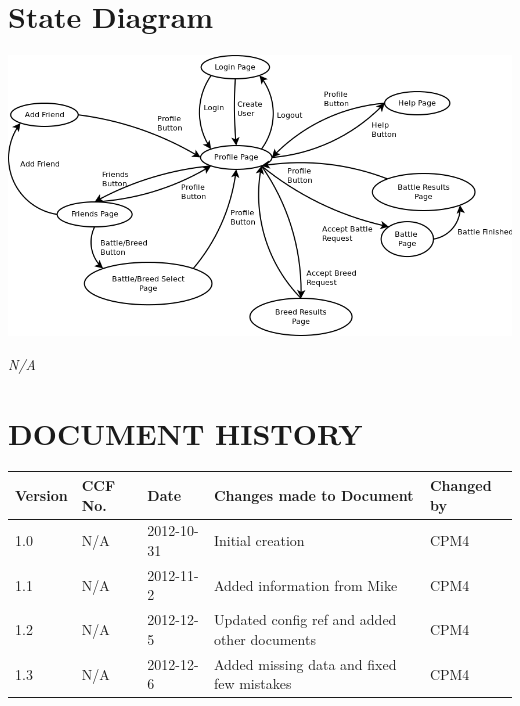 \documentclass{project}
\begin{document}
\section{State Diagram}
\begin{center}
\includegraphics[scale=0.50]{state_diagram.png}
\end{center}



\clearpage
{}
\begin{thebibliography}{5}
\bibitem{} \emph{N/A}
\end{thebibliography}
\clearpage
{}
\section*{DOCUMENT HISTORY}
\begin{tabular}{|l | l | l | l | l |}
\hline
Version & CCF No. & Date & Changes made to Document & Changed by \\
\hline
1.0 & N/A & 2012-10-31 & Initial creation & CPM4 \\
\hline
1.1 & N/A & 2012-11-2 & Added information from Mike & CPM4 \\
\hline
1.2 & N/A & 2012-12-5 & Updated config ref and added other documents & CPM4 \\
\hline
1.3 & N/A & 2012-12-6 & Added missing data and fixed few mistakes & CPM4 \\
\hline
\end{tabular}
\label{thelastpage}
\end{document}
